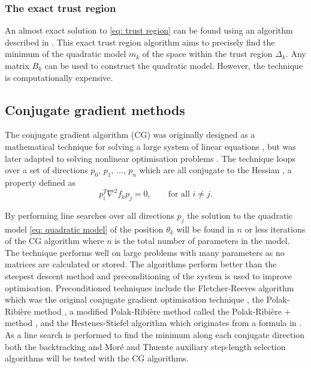 \subsubsection{The exact trust region}

An almost exact solution to \eqref{eq: trust region} can be found using an algorithm described in \citet{NocedalWright99}.  This exact trust region algorithm aims to precisely find the minimum of the quadratic model $m_k$ of the space within the trust region $\Delta_k$.  Any matrix $B_k$ can be used to construct the quadratic model.  However, the technique is computationally expensive.




\subsection{Conjugate gradient methods}

The conjugate gradient algorithm (CG) was originally designed as a mathematical technique for solving a large system of linear equations \citet{HestenesStiefel52}, but was later adapted to solving nonlinear optimisation problems \citep{FletcherReeves64}.  The technique loops over a set of directions $p_0$, $p_1$, $\hdots$, $p_n$ which are all conjugate to the Hessian \citep{NocedalWright99}, a property defined as
\begin{equation}
 p_i^T \nabla^2 f_k p_j = 0,  \qquad \textrm{for all } i \ne j.
\end{equation}

\noindent By performing line searches over all directions $p_j$ the solution to the quadratic model \eqref{eq: quadratic model} of the position $\theta_k$ will be found in $n$ or less iterations of the CG algorithm where $n$ is the total number of parameters in the model.  The technique performs well on large problems with many parameters as no matrices are calculated or stored.  The algorithms perform better than the steepest descent method and preconditioning of the system is used to improve optimisation.  Preconditioned techniques include the Fletcher-Reeves algorithm which was the original conjugate gradient optimisation technique \citep{FletcherReeves64}, the Polak-Ribi\`ere method \citep{PolakRibiere69}, a modified Polak-Ribi\`ere method called the Polak-Ribi\`ere + method \citep{NocedalWright99}, and the Hestenes-Stiefel algorithm which originates from a formula in \citet{HestenesStiefel52}.  As a line search is performed to find the minimum along each conjugate direction both the backtracking and Mor\'e and Thuente auxiliary step-length selection algorithms will be tested with the CG algorithms.




